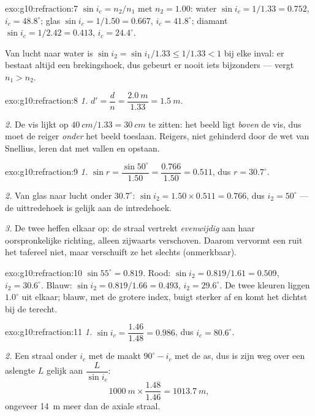 \begin{solution}{exo:g10:refraction:7}
$\sin i_c = n_2/n_1$ met $n_2 = 1.00$:
water $\sin i_c = 1/1.33 = 0.752$, $i_c = 48.8^\circ$;
glas $\sin i_c = 1/1.50 = 0.667$, $i_c = 41.8^\circ$;
diamant $\sin i_c = 1/2.42 = 0.413$, $i_c = 24.4^\circ$.

Van lucht naar water is $\sin i_2 = \sin i_1/1.33 \leq 1/1.33 < 1$ bij
elke inval: er bestaat altijd een brekingshoek, dus gebeurt er nooit iets
bijzonders ---  vergt $n_1 > n_2$.
\end{solution}

\begin{solution}{exo:g10:refraction:8}
\emph{1.} $d' = \dfrac{d}{n} = \dfrac{\qty{2.0}{m}}{1.33}
= \qty{1.5}{m}$.

\emph{2.} De vis lijkt op $\qty{40}{cm}/1.33 = \qty{30}{cm}$ te zitten:
het beeld ligt \emph{boven} de vis, dus moet de reiger \emph{onder} het
beeld toeslaan. Reigers, niet gehinderd door de wet van Snellius, leren
dat met vallen en opstaan.
\end{solution}

\begin{solution}{exo:g10:refraction:9}
\emph{1.} $\sin r = \dfrac{\sin 50^\circ}{1.50} = \dfrac{0.766}{1.50}
= 0.511$, dus $r = 30.7^\circ$.

\emph{2.} Van glas naar lucht onder $30.7^\circ$:
$\sin i_2 = 1.50 \times 0.511 = 0.766$, dus $i_2 = 50^\circ$ --- de
uittredehoek is gelijk aan de intredehoek.

\emph{3.} De twee  heffen elkaar op: de straal vertrekt
\emph{evenwijdig} aan haar oorspronkelijke richting, alleen zijwaarts
verschoven. Daarom vervormt een ruit het tafereel niet, maar verschuift
ze het slechts (onmerkbaar).
\end{solution}

\begin{solution}{exo:g10:refraction:10}
$\sin 55^\circ = 0.819$. Rood:
$\sin i_2 = 0.819/1.61 = 0.509$, $i_2 = 30.6^\circ$. Blauw:
$\sin i_2 = 0.819/1.66 = 0.493$, $i_2 = 29.6^\circ$. De twee kleuren
liggen $1.0^\circ$ uit elkaar; blauw, met de grotere index, buigt sterker
af en komt het dichtst bij de  terecht.
\end{solution}

\begin{solution}{exo:g10:refraction:11}
\emph{1.} $\sin i_c = \dfrac{1.46}{1.48} = 0.986$, dus
$i_c = 80.6^\circ$.

\emph{2.} Een straal onder $i_c$ met de  maakt $90^\circ - i_c$
met de as, dus is zijn weg over een aslengte $L$ gelijk aan
$\dfrac{L}{\sin i_c}$:
\[
\qty{1000}{m} \times \frac{1.48}{1.46} = \qty{1013.7}{m},
\]
ongeveer \qty{14}{m} meer dan de axiale straal.
\end{solution}

